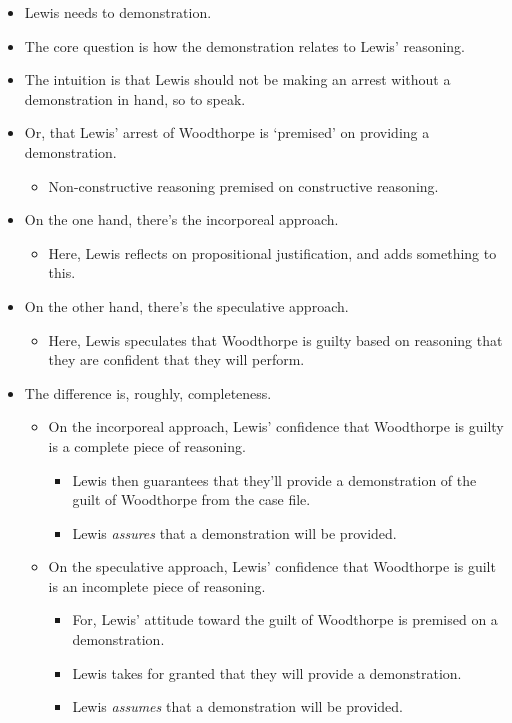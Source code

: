 \documentclass[10pt]{article}
\begin{document}
\begin{itemize}
\item Lewis needs to demonstration.
\item The core question is how the demonstration relates to Lewis' reasoning.
\item The intuition is that Lewis should not be making an arrest without a demonstration in hand, so to speak.
\item Or, that Lewis' arrest of Woodthorpe is `premised' on providing a demonstration.
  \begin{itemize}
  \item Non-constructive reasoning premised on constructive reasoning.
  \end{itemize}
\item On the one hand, there's the incorporeal approach.
  \begin{itemize}
  \item Here, Lewis reflects on propositional justification, and adds something to this.
  \end{itemize}
\item On the other hand, there's the speculative approach.
  \begin{itemize}
  \item Here, Lewis speculates that Woodthorpe is guilty based on reasoning that they are confident that they will perform.
  \end{itemize}
\item The difference is, roughly, completeness.
  \begin{itemize}
  \item On the incorporeal approach, Lewis' confidence that Woodthorpe is guilty is a complete piece of reasoning.
    \begin{itemize}
    \item Lewis then guarantees that they'll provide a demonstration of the guilt of Woodthorpe from the case file.
    \item Lewis \emph{assures} that a demonstration will be provided.
    \end{itemize}
  \item On the speculative approach, Lewis' confidence that Woodthorpe is guilt is an incomplete piece of reasoning.
    \begin{itemize}
    \item For, Lewis' attitude toward the guilt of Woodthorpe is premised on a demonstration.
    \item Lewis takes for granted that they will provide a demonstration.
    \item Lewis \emph{assumes} that a demonstration will be provided.
    \end{itemize}
  \end{itemize}
\end{itemize}
\end{document}
